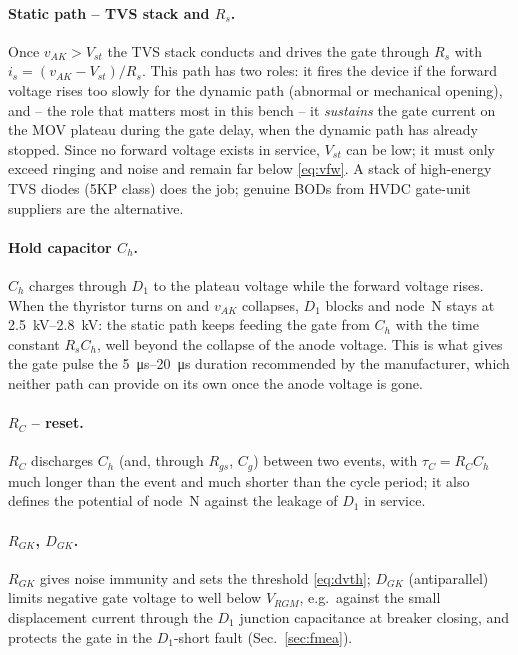 \documentclass[11pt,a4paper]{article}
\begin{document}
\paragraph{Static path -- TVS stack and $R_s$.} Once $v_{AK} > V_{st}$ the TVS stack conducts and
drives the gate through $R_s$ with $i_s = (v_{AK} - V_{st})/R_s$. This path has two roles: it
fires the device if the forward voltage rises too slowly for the dynamic path (abnormal or
mechanical opening), and -- the role that matters most in this bench -- it \emph{sustains} the
gate current on the MOV plateau during the gate delay, when the dynamic path has already stopped.
Since no forward voltage exists in service, $V_{st}$ can be low; it must only exceed ringing and
noise and remain far below \eqref{eq:vfw}. A stack of high-energy TVS diodes (5KP class) does the
job; genuine BODs from HVDC gate-unit suppliers are the alternative.

\paragraph{Hold capacitor $C_h$.} $C_h$ charges through $D_1$ to the plateau voltage while the
forward voltage rises. When the thyristor turns on and $v_{AK}$ collapses, $D_1$ blocks and node~N
stays at \SIrange{2.5}{2.8}{kV}: the static path keeps feeding the gate from $C_h$ with the time
constant $R_s C_h$, well beyond the collapse of the anode voltage. This is what gives the gate
pulse the \SIrange{5}{20}{\micro s} duration recommended by the manufacturer, which neither
path can provide on its own once the anode voltage is gone.

\paragraph{$R_C$ -- reset.} $R_C$ discharges $C_h$ (and, through $R_{gs}$, $C_g$) between two
events, with $\tau_C = R_C C_h$ much longer than the event and much shorter than the cycle
period; it also defines the potential of node~N against the leakage of $D_1$ in service.

\paragraph{$R_{GK}$, $D_{GK}$.} $R_{GK}$ gives noise immunity and sets the threshold
\eqref{eq:dvth}; $D_{GK}$ (antiparallel) limits negative gate voltage to well below $V_{RGM}$,
e.g.\ against the small displacement current through the $D_1$ junction capacitance at breaker
closing, and protects the gate in the $D_1$-short fault (Sec.~\ref{sec:fmea}).
\end{document}

